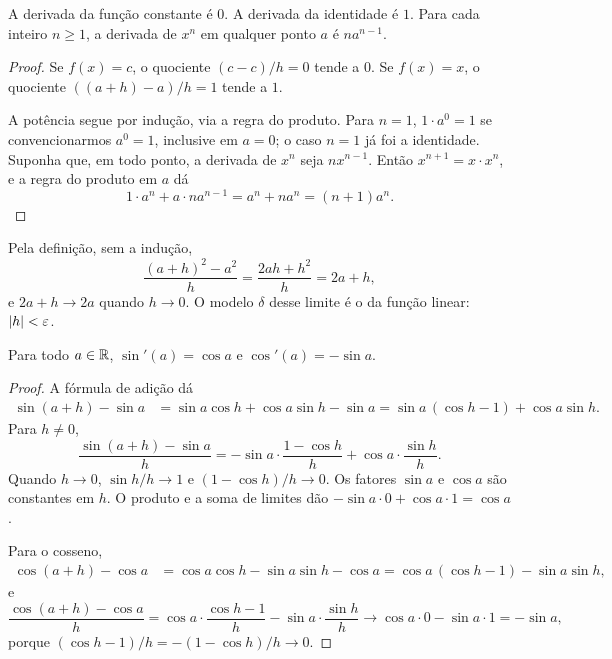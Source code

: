 \documentclass[11pt,a4paper]{article}
\begin{document}
\begin{teorema}
\label{teo:potencia}
A derivada da fun\c{c}\~ao constante \'e $0$. A derivada da identidade \'e $1$. Para cada inteiro $n\ge 1$, a derivada de $x^n$ em qualquer ponto $a$ \'e $n a^{n-1}$.
\end{teorema}

\begin{proof}
Se $f(x)=c$, o quociente $(c-c)/h=0$ tende a $0$. Se $f(x)=x$, o quociente $((a+h)-a)/h=1$ tende a $1$.

A pot\^encia segue por indu\c{c}\~ao, via a regra do produto. Para $n=1$, $1\cdot a^{0}=1$ se convencionarmos $a^0=1$, inclusive em $a=0$; o caso $n=1$ j\'a foi a identidade. Suponha que, em todo ponto, a derivada de $x^n$ seja $n x^{n-1}$. Ent\~ao $x^{n+1}=x\cdot x^n$, e a regra do produto em $a$ d\'a
\[
1\cdot a^n + a\cdot n a^{n-1}=a^n+n a^n=(n+1)a^n.
\]
\end{proof}

\begin{exemplo}
Pela defini\c{c}\~ao, sem a indu\c{c}\~ao,
\[
\frac{(a+h)^2-a^2}{h}=\frac{2ah+h^2}{h}=2a+h,
\]
e $2a+h\to 2a$ quando $h\to 0$. O modelo $\delta$ desse limite \'e o da fun\c{c}\~ao linear: $\left\lvert h \right\rvert<\varepsilon$.
\end{exemplo}

\begin{teorema}
\label{teo:sen-cos-der}
Para todo $a\in\mathbb{R}$, $\sin'(a)=\cos a$ e $\cos'(a)=-\sin a$.
\end{teorema}

\begin{proof}
A f\'ormula de adi\c{c}\~ao d\'a
\begin{align*}
\sin(a+h)-\sin a
&=\sin a\cos h+\cos a\sin h-\sin a
=\sin a\,(\cos h-1)+\cos a\sin h.
\end{align*}
Para $h\neq 0$,
\[
\frac{\sin(a+h)-\sin a}{h}
= -\sin a\cdot\frac{1-\cos h}{h}+\cos a\cdot\frac{\sin h}{h}.
\]
Quando $h\to 0$, $\sin h/h\to 1$ e $(1-\cos h)/h\to 0$. Os fatores $\sin a$ e $\cos a$ s\~ao constantes em $h$. O produto e a soma de limites d\~ao $-\sin a\cdot 0+\cos a\cdot 1=\cos a$.

Para o cosseno,
\begin{align*}
\cos(a+h)-\cos a
&=\cos a\cos h-\sin a\sin h-\cos a
=\cos a\,(\cos h-1)-\sin a\sin h,
\end{align*}
e
\[
\frac{\cos(a+h)-\cos a}{h}
=\cos a\cdot\frac{\cos h-1}{h}-\sin a\cdot\frac{\sin h}{h}
\to \cos a\cdot 0-\sin a\cdot 1=-\sin a,
\]
porque $(\cos h-1)/h=-(1-\cos h)/h\to 0$.
\end{proof}
\end{document}
